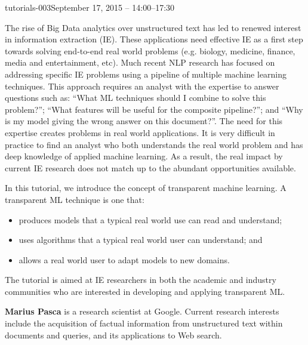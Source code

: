 \begin{tutorial}{tutorials-003}{September 17, 2015 -- 14:00--17:30}
{\TutLocC}

The rise of Big Data analytics over unstructured text has led to renewed
interest in information extraction (IE). These applications need effective
IE as a first step towards solving end-to-end real world problems
(e.g. biology, medicine, finance, media and entertainment, etc). Much
recent NLP research has focused on addressing specific IE problems
using a pipeline of multiple machine learning techniques. This approach
requires an analyst with the expertise to answer questions such as:
“What ML techniques should I combine to solve this problem?”; “What
features will be useful for the composite pipeline?”; and “Why is
my model giving the wrong answer on this document?”. The need for
this expertise creates problems in real world applications. It is
very difficult in practice to find an analyst who both understands
the real world problem and has deep knowledge of applied machine learning.
As a result, the real impact by current IE research does not match
up to the abundant opportunities available.

In this tutorial, we introduce the concept of transparent machine
learning. A transparent ML technique is one that:
\begin{itemize}
\item produces models that a typical real world use can read and understand;
\item uses algorithms that a typical real world user can understand; and
\item allows a real world user to adapt models to new domains.
\end{itemize}
The tutorial is aimed at IE researchers in both the academic and industry
communities who are interested in developing and applying transparent
ML.

\end{tutorial} 

\clearpage{}

\begin{bio}

\textbf{Marius Pasca} is a research scientist at Google. Current research
interests include the acquisition of factual information from unstructured
text within documents and queries, and its applications to Web search.


\end{bio}

